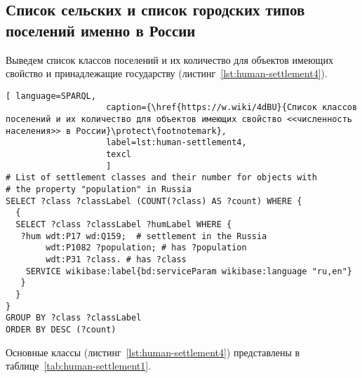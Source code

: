 \subsection{Список сельских и список городских типов поселений именно в России}

Выведем список классов поселений и их количество для объектов имеющих свойство  и принадлежащие государству  (листинг~\ref{lst:human-settlement4}). 

\begin{lstlisting}[ language=SPARQL, 
                    caption={\href{https://w.wiki/4dBU}{Список классов поселений и их количество для объектов имеющих свойство <<численность населения>> в России}\protect\footnotemark},
                    label=lst:human-settlement4,
                    texcl 
                    ]
# List of settlement classes and their number for objects with 
# the property "population" in Russia
SELECT ?class ?classLabel (COUNT(?class) AS ?count) WHERE {
  {
  SELECT ?class ?classLabel ?humLabel WHERE {
   ?hum wdt:P17 wd:Q159;  # settlement in the Russia
        wdt:P1082 ?population; # has ?population
        wdt:P31 ?class. # has ?class
    SERVICE wikibase:label{bd:serviceParam wikibase:language "ru,en"}
   }
  }
}
GROUP BY ?class ?classLabel
ORDER BY DESC (?count)
\end{lstlisting}%

Основные классы (листинг~\ref{lst:human-settlement4}) представлены в таблице~\ref{tab:human-settlement1}.

